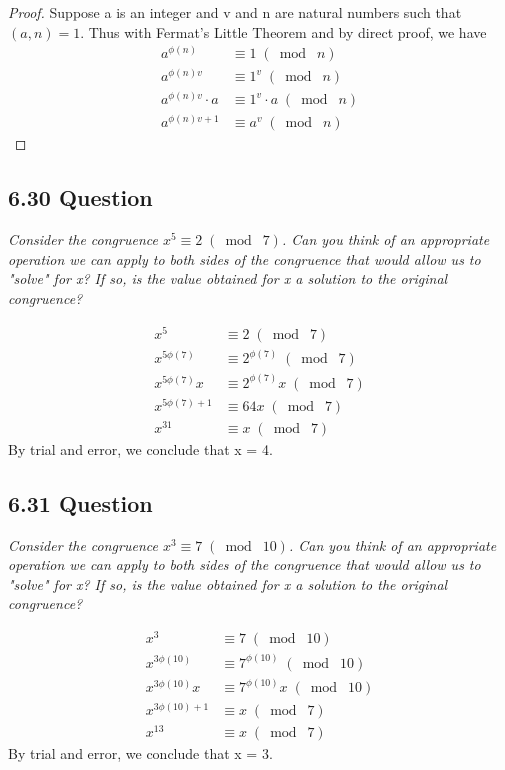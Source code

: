 \documentclass{article}
\begin{document}
\begin{proof}
Suppose a is an integer and v and n are natural numbers such that $(a, n) = 1$. Thus with Fermat's Little Theorem and by direct proof, we have
\begin{align*}
    &&a^{\phi(n)} &\equiv 1 \;(\bmod\; n)&&\\
    &&a^{\phi(n)v} &\equiv 1^v \;(\bmod\; n)&&\\
    &&a^{\phi(n)v}\cdot a &\equiv 1^v \cdot a \;(\bmod\; n)&&\\
    &&a^{\phi(n)v + 1} &\equiv a^v \;(\bmod\; n)&&
\end{align*}
\end{proof}

\subsection*{6.30 Question} 
\quad \textit{Consider the congruence $x^5 \equiv 2 \;(\bmod\; 7)$. Can you think of an appropriate operation we can apply to both sides of the congruence that would allow us to "solve" for x? If so, is the value obtained for x a solution to the original congruence?}

\begin{align*}
    &&x^5 &\equiv 2 \;(\bmod\; 7)&&\\
    &&x^{5\phi(7)} &\equiv 2^{\phi(7)} \;(\bmod\; 7)&&\\
    &&x^{5\phi(7)}x &\equiv 2^{\phi(7)}x \;(\bmod\; 7)&&\\
    &&x^{5\phi(7)+1} &\equiv 64x \;(\bmod\; 7)&&\\
    &&x^{31} &\equiv x \;(\bmod\; 7)&&
\end{align*}
By trial and error, we conclude that x = 4.

\subsection*{6.31 Question} 
\quad \textit{Consider the congruence $x^3 \equiv 7 \;(\bmod\; 10)$. Can you think of an appropriate operation we can apply to both sides of the congruence that would allow us to "solve" for x? If so, is the value obtained for x a solution to the original congruence?}

\begin{align*}
    &&x^3 &\equiv 7 \;(\bmod\; 10)&&\\
    &&x^{3\phi(10)} &\equiv 7^{\phi(10)} \;(\bmod\; 10)&&\\
    &&x^{3\phi(10)}x &\equiv 7^{\phi(10)}x \;(\bmod\; 10)&&\\
    &&x^{3\phi(10)+1} &\equiv x \;(\bmod\; 7)&&\\
    &&x^{13} &\equiv x \;(\bmod\; 7)&&
\end{align*}
By trial and error, we conclude that x = 3.
\end{document}
